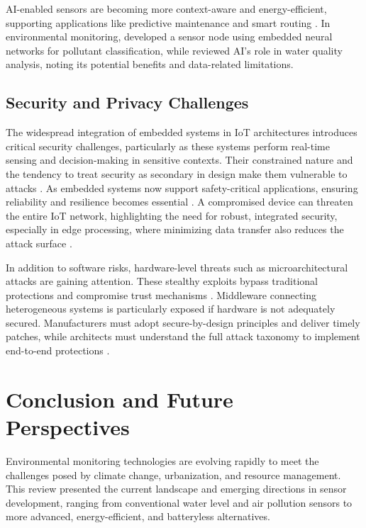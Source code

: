 \documentclass[conference]{IEEEtran}
\begin{document}
AI-enabled sensors are becoming more context-aware and energy-efficient, supporting applications like predictive maintenance and smart routing \cite{mukhopadhyay_2021_artificial}. In environmental monitoring, \cite{ferreira_2023_conception} developed a sensor node using embedded neural networks for pollutant classification, while \cite{nr_2025_ai} reviewed AI's role in water quality analysis, noting its potential benefits and data-related limitations.

\subsection{Security and Privacy Challenges}

The widespread integration of embedded systems in IoT architectures introduces critical security challenges, particularly as these systems perform real-time sensing and decision-making in sensitive contexts. Their constrained nature and the tendency to treat security as secondary in design make them vulnerable to attacks \cite{pimentel_2017_exploring}. As embedded systems now support safety-critical applications, ensuring reliability and resilience becomes essential \cite{koulamas_2018_realtime}. A compromised device can threaten the entire IoT network, highlighting the need for robust, integrated security, especially in edge processing, where minimizing data transfer also reduces the attack surface \cite{tien_2017_internet}.

In addition to software risks, hardware-level threats such as microarchitectural attacks are gaining attention. These stealthy exploits bypass traditional protections and compromise trust mechanisms \cite{fournaris_2017_exploiting}. Middleware connecting heterogeneous systems is particularly exposed if hardware is not adequately secured. Manufacturers must adopt secure-by-design principles and deliver timely patches, while architects must understand the full attack taxonomy to implement end-to-end protections \cite{fournaris_2017_exploiting, pimentel_2017_exploring}.

\section{Conclusion and Future Perspectives} \label{cap:conclusion}

Environmental monitoring technologies are evolving rapidly to meet the challenges posed by climate change, urbanization, and resource management. This review presented the current landscape and emerging directions in sensor development, ranging from conventional water level and air pollution sensors to more advanced, energy-efficient, and batteryless alternatives.
\end{document}
